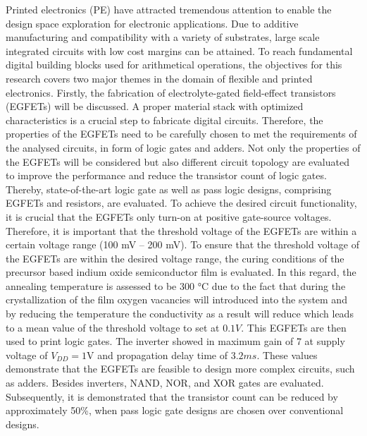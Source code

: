 
Printed electronics (PE) have attracted tremendous attention to enable the design space exploration for electronic applications. Due to additive manufacturing and compatibility with a variety of substrates, large scale integrated circuits with low cost margins can be attained. To reach fundamental digital building blocks used  for arithmetical operations, the objectives for this research covers two major themes in the domain of flexible and printed electronics.
Firstly, the fabrication of electrolyte-gated field-effect transistors (EGFETs) will be discussed. A proper material stack with optimized characteristics is a crucial step to fabricate digital circuits. Therefore, the properties of the EGFETs need to be carefully chosen to met the requirements of the analysed circuits, in form of logic gates and adders. Not only the properties of the EGFETs will be considered but also different circuit topology are evaluated to improve the performance and reduce the transistor count of logic gates. Thereby, state-of-the-art logic gate as well as pass logic designs, comprising EGFETs and resistors, are evaluated. 
To achieve the desired circuit functionality, it is crucial that the EGFETs only turn-on at positive gate-source voltages. Therefore, it is important that the threshold voltage of the EGFETs are within a certain voltage range (100 mV – 200 mV). To ensure that the threshold voltage of the EGFETs are within the desired voltage range, the curing conditions of the precursor based indium oxide semiconductor film is evaluated. In this regard, the annealing temperature is assessed to be 300 °C due to the fact that during the crystallization of the film oxygen vacancies will introduced into the system and by reducing the temperature the conductivity as a result will reduce which leads to a mean value of the threshold voltage to set at $0.1V $.
This EGFETs are then used to print logic gates. The inverter showed in maximum gain of 7 at supply voltage of $V_{DD}$$=1$V and propagation delay time of $3.2 ms$. These values demonstrate that the EGFETs are feasible to design more complex circuits, such as adders. Besides inverters, NAND, NOR, and XOR gates are evaluated. Subsequently, it is demonstrated that the transistor count can be reduced by approximately 50\%, when pass logic gate designs are chosen over conventional designs. 
